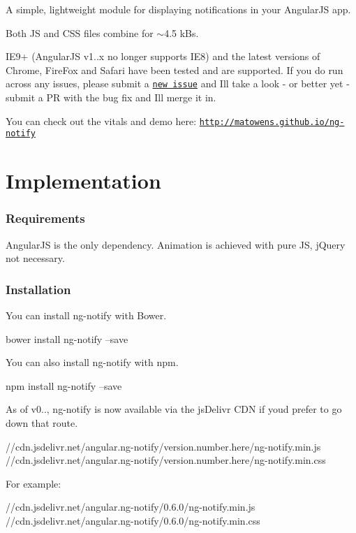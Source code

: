 A simple, lightweight module for displaying notifications in your Angular\+JS app.

Both JS and C\+SS files combine for $\sim$4.5 k\+Bs.

I\+E9+ (Angular\+JS v1..\+x no longer supports I\+E8) and the latest versions of Chrome, Fire\+Fox and Safari have been tested and are supported. If you do run across any issues, please submit a \href{https://github.com/matowens/ng-notify/issues}{\tt new issue} and I\textquotesingle{}ll take a look -\/ or better yet -\/ submit a PR with the bug fix and I\textquotesingle{}ll merge it in.

You can check out the vitals and demo here\+: \href{http://matowens.github.io/ng-notify}{\tt http\+://matowens.\+github.\+io/ng-\/notify}

\section*{Implementation }

\subsubsection*{Requirements}

Angular\+JS is the only dependency. Animation is achieved with pure JS, j\+Query not necessary.

\subsubsection*{Installation}

You can install ng-\/notify with Bower. \begin{DoxyVerb}bower install ng-notify --save
\end{DoxyVerb}


You can also install ng-\/notify with npm. \begin{DoxyVerb}npm install ng-notify --save
\end{DoxyVerb}


As of v0.., ng-\/notify is now available via the js\+Delivr C\+DN if you\textquotesingle{}d prefer to go down that route. \begin{DoxyVerb}//cdn.jsdelivr.net/angular.ng-notify/{version.number.here}/ng-notify.min.js
//cdn.jsdelivr.net/angular.ng-notify/{version.number.here}/ng-notify.min.css
\end{DoxyVerb}


For example\+: \begin{DoxyVerb}//cdn.jsdelivr.net/angular.ng-notify/0.6.0/ng-notify.min.js
//cdn.jsdelivr.net/angular.ng-notify/0.6.0/ng-notify.min.css
\end{DoxyVerb}


